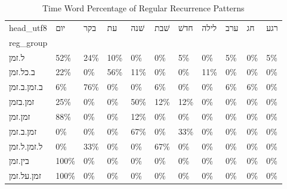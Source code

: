 \begin{table}[htbp!]
\centering
\caption{Time Word Percentage of Regular Recurrence Patterns}
\label{table:regrechead_pc}
\begin{tabular}{lllllllllll}
\toprule
head\_utf8 &   יום &  בקר &   עת & שׁנה & שׁבת & חדשׁ & לילה & ערב &  חג & רגע \\
reg\_group   &       &      &      &      &      &      &      &     &     &     \\
\midrule
ל.זמן       &   52\% &  24\% &  10\% &   0\% &   0\% &   5\% &   0\% &  5\% &  0\% &  5\% \\
ב.כל.זמן    &   22\% &   0\% &  56\% &  11\% &   0\% &   0\% &  11\% &  0\% &  0\% &  0\% \\
ב.זמן.ב.זמן &    6\% &  76\% &   0\% &   0\% &   6\% &   0\% &   0\% &  6\% &  6\% &  0\% \\
זמן.בזמן    &   25\% &   0\% &   0\% &  50\% &  12\% &  12\% &   0\% &  0\% &  0\% &  0\% \\
זמן.זמן     &   88\% &   0\% &   0\% &  12\% &   0\% &   0\% &   0\% &  0\% &  0\% &  0\% \\
זמן.ב.זמן   &    0\% &   0\% &   0\% &  67\% &   0\% &  33\% &   0\% &  0\% &  0\% &  0\% \\
ל.זמן.ל.זמן &    0\% &  33\% &   0\% &   0\% &  67\% &   0\% &   0\% &  0\% &  0\% &  0\% \\
בין.זמן     &  100\% &   0\% &   0\% &   0\% &   0\% &   0\% &   0\% &  0\% &  0\% &  0\% \\
זמן.על.זמן  &  100\% &   0\% &   0\% &   0\% &   0\% &   0\% &   0\% &  0\% &  0\% &  0\% \\
\bottomrule
\end{tabular}
\end{table}
